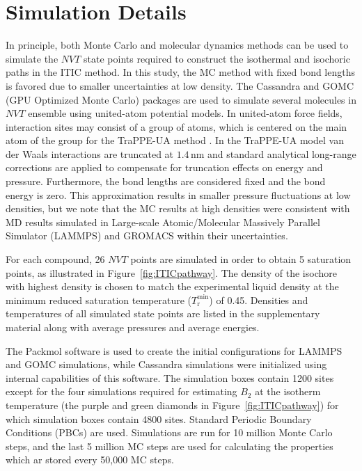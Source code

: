 \documentclass[5p,times]{elsarticle}
\begin{document}
\section{Simulation Details} \label{sec:SimDetail}
In principle, both Monte Carlo and molecular dynamics methods can be used to simulate the $NVT$ state points required to construct the isothermal and isochoric paths in the ITIC method. In this study, the MC method with fixed bond lengths is favored due to smaller uncertainties at low density. The Cassandra \cite{Shah2017} and GOMC (GPU Optimized Monte Carlo) \cite{Mick2013} packages are used to simulate several molecules in $NVT$ ensemble using united-atom potential models. In united-atom force fields, interaction sites may consist of a group of atoms, which is centered on the main atom of the group for the TraPPE-UA method \cite{Smit1998}. In the TraPPE-UA model van der Waals interactions are truncated at $1.4\,\mathrm{nm}$ and standard analytical long-range corrections are applied to compensate for truncation effects on energy and pressure\cite{allen2017}. Furthermore, the bond lengths are considered fixed and the bond energy is zero. This approximation results in smaller pressure fluctuations at low densities, but we note that the MC results at high densities were consistent with MD results simulated in Large-scale Atomic/Molecular Massively Parallel Simulator (LAMMPS) \cite{Plimpton2007} and GROMACS \cite{Lindahl2001} within their uncertainties.

For each compound, 26 $NVT$ points are simulated in order to obtain 5 saturation points, as illustrated in Figure~\ref{fig:ITICpathway}. The density of the isochore with highest density is chosen to match the experimental liquid density at the minimum reduced saturation temperature ($T_\mathrm{r}^\mathrm{min}$) of 0.45. Densities and temperatures of all simulated state points are listed in the supplementary material along with average pressures and average energies.

The Packmol \cite{martinez2009packmol} software is used to create the initial configurations for LAMMPS and GOMC simulations, while Cassandra simulations were initialized using internal capabilities of this software. The simulation boxes contain 1200 sites except for the four simulations required for estimating $B_2$ at the isotherm temperature (the purple and green diamonds in Figure~\ref{fig:ITICpathway}) for which simulation boxes contain 4800 sites. Standard Periodic Boundary Conditions (PBCs) are used. Simulations are run for 10 million Monte Carlo steps, and the last 5 million MC steps are used for calculating the properties which ar stored every 50,000 MC steps. 
\end{document}
